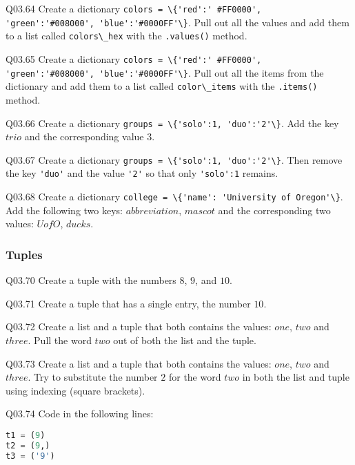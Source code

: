 \documentclass{book}
\newcommand{\passthrough}[1]{#1}
\begin{document}
Q03.64 Create a dictionary
\passthrough{\lstinline!colors = \{'red':' #FF0000', 'green':'#008000', 'blue':'#0000FF'\}!}.
Pull out all the values and add them to a list called
\passthrough{\lstinline!colors\_hex!} with the
\passthrough{\lstinline!.values()!} method.

Q03.65 Create a dictionary
\passthrough{\lstinline!colors = \{'red':' #FF0000', 'green':'#008000', 'blue':'#0000FF'\}!}.
Pull out all the items from the dictionary and add them to a list called
\passthrough{\lstinline!color\_items!} with the
\passthrough{\lstinline!.items()!} method.

Q03.66 Create a dictionary
\passthrough{\lstinline!groups = \{'solo':1, 'duo':'2'\}!}. Add the key
\(trio\) and the corresponding value \(3\).

Q03.67 Create a dictionary
\passthrough{\lstinline!groups = \{'solo':1, 'duo':'2'\}!}. Then remove
the key \passthrough{\lstinline!'duo'!} and the value
\passthrough{\lstinline!'2'!} so that only
\passthrough{\lstinline!'solo':1!} remains.

Q03.68 Create a dictionary
\passthrough{\lstinline!college = \{'name': 'University of Oregon'\}!}.
Add the following two keys: \(abbreviation\), \(mascot\) and the
corresponding two values: \(UofO\), \(ducks\).
    




    
        \hypertarget{tuples}{%
\subsubsection{Tuples}\label{tuples}}

Q03.70 Create a tuple with the numbers \(8\), \(9\), and \(10\).

Q03.71 Create a tuple that has a single entry, the number \(10\).

Q03.72 Create a list and a tuple that both contains the values: \(one\),
\(two\) and \(three\). Pull the word \(two\) out of both the list and
the tuple.

Q03.73 Create a list and a tuple that both contains the values: \(one\),
\(two\) and \(three\). Try to substitute the number \(2\) for the word
\(two\) in both the list and tuple using indexing (square brackets).

Q03.74 Code in the following lines:

\begin{lstlisting}[language=Python]
t1 = (9)
t2 = (9,)
t3 = ('9')
\end{lstlisting}
\end{document}
